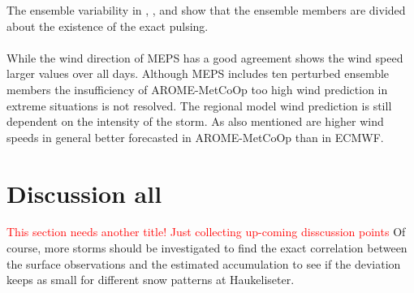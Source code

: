 The ensemble variability in , , and  show that the ensemble members are divided about the existence of the exact pulsing. 
\\
\\
While the wind direction of MEPS has a good agreement shows the wind speed larger values over all days. Although MEPS includes ten perturbed ensemble members the insufficiency of AROME-MetCoOp too high wind prediction in extreme situations is not resolved. The regional model wind prediction is still dependent on the intensity of the storm. As \cite{muller_arome-metcoop:_2017} also mentioned are higher wind speeds in general better forecasted in AROME-MetCoOp than in ECMWF. 
\section{Discussion all}
\textcolor{red}{This section needs another title! Just collecting up-coming disscussion points}
Of course, more storms should be investigated to find the exact correlation between the surface observations and the estimated accumulation to see if the deviation keeps as small for different snow patterns at Haukeliseter. 
